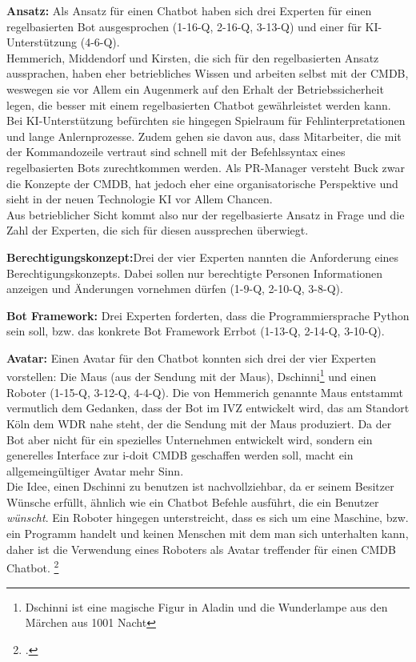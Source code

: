 \textbf{Ansatz:} Als Ansatz für einen Chatbot haben sich drei Experten für einen regelbasierten Bot ausgesprochen (1-16-Q, 2-16-Q, 3-13-Q) und einer für KI-Unterstützung (4-6-Q).\\
Hemmerich, Middendorf und Kirsten, die sich für den regelbasierten Ansatz aussprachen, haben eher betriebliches Wissen und arbeiten selbst mit der \acs{CMDB}, weswegen sie vor Allem ein Augenmerk auf den Erhalt der Betriebssicherheit legen, die besser mit einem regelbasierten Chatbot gewährleistet werden kann. Bei KI-Unterstützung befürchten sie hingegen Spielraum für Fehlinterpretationen und lange Anlernprozesse. Zudem gehen sie davon aus, dass Mitarbeiter, die mit der Kommandozeile vertraut sind schnell mit der Befehlssyntax eines regelbasierten Bots zurechtkommen werden. Als PR-Manager versteht Buck zwar die Konzepte der \acs{CMDB}, hat jedoch eher eine organisatorische Perspektive und sieht in der neuen Technologie KI vor Allem Chancen.\\
Aus betrieblicher Sicht kommt also nur der regelbasierte Ansatz in Frage und die Zahl der Experten, die sich für diesen aussprechen überwiegt. 

\textbf{Berechtigungskonzept:}Drei der vier Experten nannten die Anforderung eines Berechtigungskonzepts. Dabei sollen nur berechtigte Personen Informationen anzeigen und Änderungen vornehmen dürfen (1-9-Q, 2-10-Q, 3-8-Q).

\textbf{Bot Framework:} Drei Experten forderten, dass die Programmiersprache Python sein soll, bzw. das konkrete Bot Framework Errbot (1-13-Q, 2-14-Q, 3-10-Q).

\textbf{Avatar:} Einen Avatar für den Chatbot konnten sich drei der vier Experten vorstellen: Die Maus (aus der Sendung mit der Maus), Dschinni\footnote{Dschinni ist eine magische Figur in Aladin und die Wunderlampe aus den Märchen aus 1001 Nacht} und einen Roboter (1-15-Q, 3-12-Q, 4-4-Q). Die von Hemmerich genannte Maus entstammt vermutlich dem Gedanken, dass der Bot im \acs{IVZ} entwickelt wird, das am Standort Köln dem \acs{WDR} nahe steht, der die Sendung mit der Maus produziert. Da der Bot aber nicht für ein spezielles Unternehmen entwickelt wird, sondern ein generelles Interface zur i-doit \acs{CMDB} geschaffen werden soll, macht ein allgemeingültiger Avatar mehr Sinn.\\
Die Idee, einen Dschinni zu benutzen ist nachvollziehbar, da er seinem Besitzer Wünsche erfüllt, ähnlich wie ein Chatbot Befehle ausführt, die ein Benutzer \textit{wünscht}. Ein Roboter hingegen unterstreicht, dass es sich um eine Maschine, bzw. ein Programm handelt und keinen Menschen mit dem man sich unterhalten kann, daher ist die Verwendung eines Roboters als Avatar treffender für einen \acs{CMDB} Chatbot.
\footcite[Vgl.][o. \pno]{WDR_Maus}

